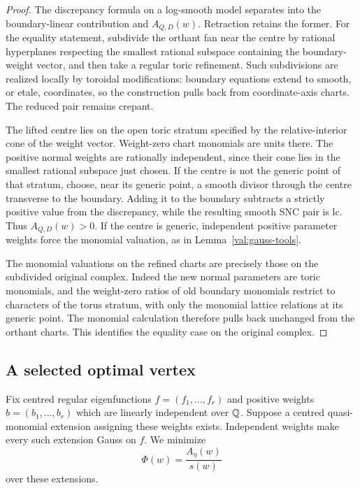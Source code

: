 \begin{proof}
The discrepancy formula on a log-smooth model separates into the
boundary-linear contribution and $A_{Q,D}(w)$. Retraction retains
the former. For the equality statement, subdivide the orthant fan
near the centre by rational hyperplanes respecting the smallest
rational subspace containing the boundary-weight vector, and then
take a regular toric refinement. Such subdivisions are realized
locally by toroidal modifications: boundary equations extend to
smooth, or etale, coordinates, so the construction pulls back from
coordinate-axis charts. The reduced pair remains crepant.

The lifted centre lies on the open toric stratum specified by the
relative-interior cone of the weight vector. Weight-zero chart
monomials are units there. The positive normal weights are
rationally independent, since their cone lies in the smallest
rational subspace just chosen. If the centre is not the generic
point of that stratum, choose, near its generic point, a smooth
divisor through the centre transverse to the boundary. Adding it
to the boundary subtracts a strictly positive value from the
discrepancy, while the resulting smooth SNC pair is lc. Thus
$A_{Q,D}(w)>0$. If the centre is generic, independent positive
parameter weights force the monomial valuation, as in
Lemma~\ref{val:gauss-tools}.

The monomial valuations on the refined charts are precisely those
on the subdivided original complex. Indeed the new normal parameters
are toric monomials, and the weight-zero ratios of old boundary
monomials restrict to characters of the torus stratum, with only
the monomial lattice relations at its generic point. The monomial
calculation therefore pulls back unchanged from the orthant charts.
This identifies the equality case on the original complex.
\end{proof}

\subsection{A selected optimal vertex}

Fix centred regular eigenfunctions $f=(f_1,\ldots,f_r)$ and positive
weights $b=(b_1,\ldots,b_r)$ which are linearly independent over $\mathbb Q$.
Suppose a centred quasi-monomial extension assigning these weights
exists. Independent weights make every such extension Gauss on $f$.
We minimize
\begin{equation}\label{val:ratio}
 \Phi(w)=\frac{A_\eta(w)}{s(w)}
\end{equation}
over these extensions.

